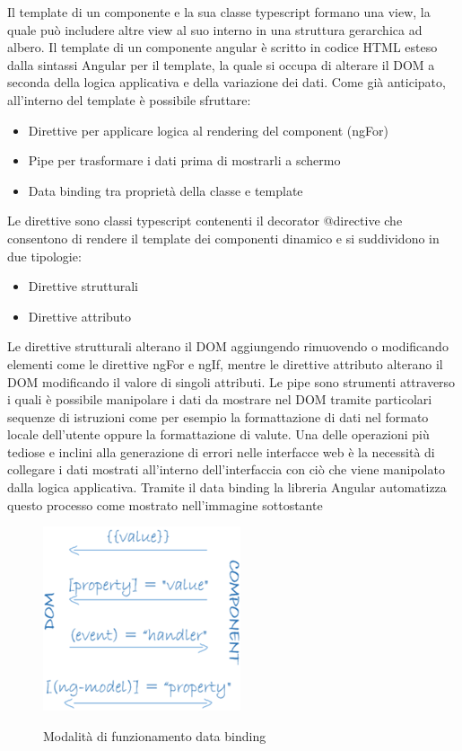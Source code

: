 Il template di un componente e la sua classe typescript formano una view, la quale può includere altre view al suo interno in una struttura gerarchica ad albero.
\newline
Il template di un componente angular è scritto in codice HTML esteso dalla sintassi Angular per il template, la quale si occupa di alterare il DOM a seconda della logica applicativa e della variazione dei dati.
Come già anticipato, all'interno del template è possibile sfruttare:
\begin{itemize}
    \item Direttive per applicare logica al rendering del component (ngFor)
    \item Pipe per trasformare i dati prima di mostrarli a schermo 
    \item Data binding tra proprietà della classe e template
\end{itemize}
Le direttive sono classi typescript contenenti il decorator @directive che consentono di rendere il template dei componenti dinamico e si suddividono in due tipologie:
\begin{itemize}
    \item Direttive strutturali
    \item Direttive attributo
\end{itemize}
Le direttive strutturali alterano il DOM aggiungendo rimuovendo o modificando elementi come le direttive ngFor e ngIf,
mentre le direttive attributo alterano il DOM modificando il valore di singoli attributi.
\newline
\newline
Le pipe sono strumenti attraverso i quali è possibile manipolare i dati da mostrare nel DOM tramite particolari sequenze di istruzioni come per esempio la formattazione di dati nel formato locale dell'utente oppure la formattazione di valute.
\newline
\newline
Una delle operazioni più tediose e inclini alla generazione di errori nelle interfacce web è la necessità di collegare i dati mostrati all'interno dell'interfaccia con ciò che viene manipolato dalla logica applicativa. Tramite il data binding la libreria Angular automatizza questo processo come mostrato nell'immagine sottostante
\newline
\newline
\begin{figure}[H]
    \centering
    \includegraphics[scale=1]{resources/databinding.png}
    \cite{angular-doc}
    \caption{Modalità di funzionamento data binding}
\end{figure}
